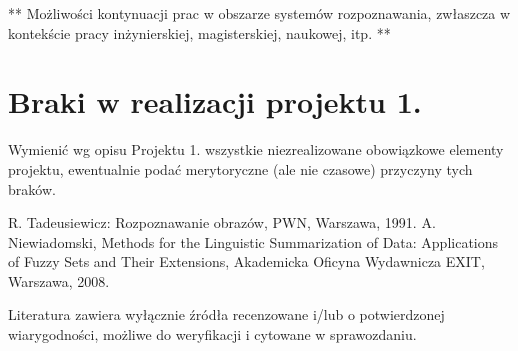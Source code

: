 \documentclass{classrep}
\begin{document}
** Możliwości kontynuacji prac w obszarze systemów rozpoznawania, zwłaszcza w kontekście pracy inżynierskiej,
magisterskiej, naukowej, itp. **\\



\section{Braki w realizacji projektu 1.}
Wymienić wg opisu Projektu 1. wszystkie niezrealizowane obowiązkowe elementy projektu, ewentualnie
podać merytoryczne (ale nie czasowe) przyczyny tych braków. 


\begin{thebibliography}{0}
 R. Tadeusiewicz: Rozpoznawanie obrazów, PWN, Warszawa, 1991.  
 A. Niewiadomski, Methods for the Linguistic Summarization of Data: Applications of Fuzzy Sets and Their Extensions, Akademicka Oficyna Wydawnicza EXIT, Warszawa, 2008.
\end{thebibliography}

Literatura zawiera wyłącznie źródła recenzowane i/lub o potwierdzonej wiarygodności,
możliwe do weryfikacji i cytowane w sprawozdaniu. 
\end{document}
